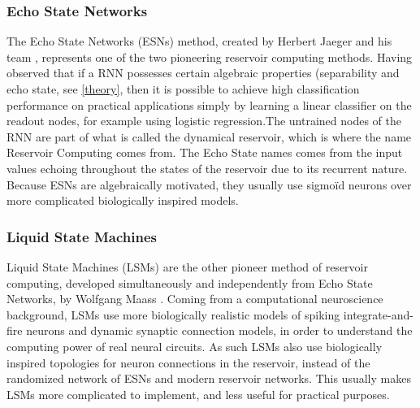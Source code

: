 \documentclass[12pt,oneside]{CUNY_CS_PhD}
\begin{document}
\subsubsection{Echo State Networks}
The Echo State Networks (ESNs) method, created by Herbert Jaeger and his team \cite{jaeger_echo_2001}, represents one of the two pioneering reservoir computing methods. Having observed that if a RNN possesses certain algebraic properties (separability and echo state, see \ref{theory},
 then it is possible to achieve high classification performance on practical applications simply by learning a linear classifier on the readout nodes, for example using logistic regression.The untrained nodes of the RNN are part of what is called the dynamical reservoir, which is where the name Reservoir Computing comes from. The Echo State names comes from the input values echoing throughout the states of the reservoir due to its recurrent nature. Because ESNs are algebraically motivated, they usually use sigmoïd neurons over more complicated biologically inspired models.

\subsubsection{Liquid State Machines}
Liquid State Machines (LSMs) are the other pioneer method of reservoir computing, developed simultaneously and independently from Echo State Networks, by Wolfgang Maass \cite{Natschlager2002}. Coming from a computational neuroscience background, LSMs use more biologically realistic models of spiking integrate-and-fire neurons and dynamic synaptic connection models,
 in order to understand the computing power of real neural circuits. As such LSMs also use biologically inspired topologies for neuron connections in the reservoir, instead of the randomized network of ESNs and modern reservoir networks. 
This usually makes LSMs more complicated to implement, and less useful for practical purposes.
\end{document}
